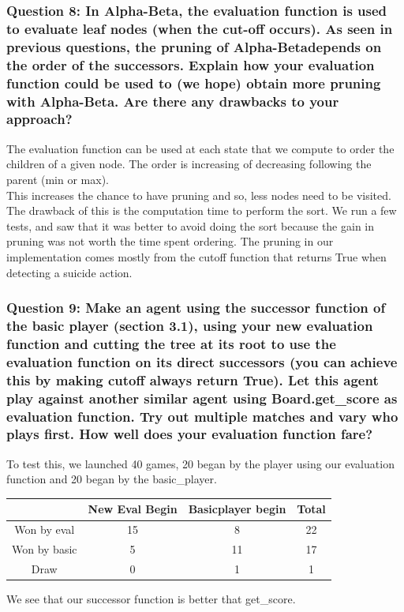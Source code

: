 \documentclass[a4paper,10pt]{article}
\begin{document}
				\subsubsection{Question 8: In Alpha-Beta, the evaluation function is used to evaluate leaf nodes (when the cut-off occurs). As seen in previous questions, the pruning of Alpha-Betadepends on the order of the successors. Explain how your evaluation function could be used to (we hope) obtain more pruning with Alpha-Beta. Are there any drawbacks to your approach?}
					The evaluation function can be used at each state that we compute to order the children of a given node. The order is increasing of decreasing following the parent (min or max).\\
					This increases the chance to have pruning and so, less nodes need to be visited.\\
					The drawback of this is the computation time to perform the sort. We run a few tests, and saw that it was better to avoid doing the sort because the gain in pruning was not worth the time spent ordering.
					The pruning in our implementation comes mostly from the cutoff function that returns True when detecting a suicide action.
				\subsubsection{Question 9: Make an agent using the successor function of the basic player (section 3.1), using your new evaluation function and cutting the tree at its root to use the evaluation function on its direct successors (you can achieve this by making cutoff always return True). Let this agent play against another similar agent using Board.get\_score as evaluation function. Try out multiple matches and vary who plays first. How well does your evaluation function fare?}
					To test this, we launched 40 games, 20 began by the player using our evaluation function and 20 began by the basic\_player.
					\begin{center}
					\begin{tabular}{|c|c|c|c|}
						\hline 
						 & New Eval Begin & Basicplayer begin & Total \\ 
						\hline 
						Won by eval & 15 & 8 & 22 \\ 
						\hline 
						Won by basic & 5 & 11 & 17 \\ 
						\hline 
						Draw & 0 & 1 & 1 \\ 
						\hline 
						\end{tabular} 
					\end{center}
					We see that our successor function is better that get\_score.
\end{document}
